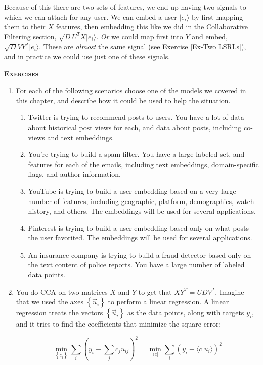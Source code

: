 \documentclass{amsbook}
\begin{document}
Because of this there are two sets of features, we end up having two signals to which we can attach for any user.  We can embed a user $|e_i\rangle$ by first mapping them to their $X$ features, then embedding this like we did in the Collaborative Filtering section, $\sqrt DU^TX|e_i\rangle$.  {\it Or} we could map first into $Y$ and embed, $\sqrt DVY^T|e_i\rangle$.  These are {\it almost} the same signal (see Exercise \ref{Ex-Two LSRLs}), and in practice we could use just one of these signals.

{\bfseries\scshape\Large Exercises}

\begin{enumerate}
\item For each of the following scenarios choose one of the models we covered in this chapter, and describe how it could be used to help the situation.
\begin{enumerate}
\item Twitter is trying to recommend posts to users.  You have a lot of data about historical post views for each, and data about posts, including co-views and text embeddings.
\item You're trying to build a spam filter.  You have a large labeled set, and features for each of the emails, including text embeddings, domain-specific flags, and author information.
\item YouTube is trying to build a user embedding based on a very large number of features, including geographic, platform, demographics, watch history, and others.  The embeddings will be used for several applications.
\item Pinterest is trying to build a user embedding based only on what posts the user favorited.  The embeddings will be used for several applications.
\item An insurance company is trying to build a fraud detector based only on the text content of police reports.  You have a large number of labeled data points.
\end{enumerate}
\item \label{Ex-Two LSRLs} You do CCA on two matrices $X$ and $Y$ to get that $XY^T=UDV^T$.  Imagine that we used the axes $\left\{\vec u_i\right\}$ to perform a linear regression.  A linear regression treats the vectors $\left\{\vec u_i\right\}$ as the data points, along with targets $y_i$, and it tries to find the coefficients that minimize the square error:

$$
\min_{\left\{c_j\right\}}\sum_i \left(y_i-\sum_jc_ju_{ij}\right)^2 = \min_{\langle c|}\sum_i \left(y_i-\langle c|u_{i}\rangle\right)^2
$$


\end{enumerate}
\end{document}
